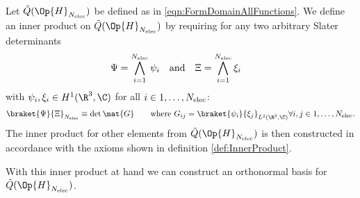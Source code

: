 \begin{defn}
	Let $\tilde{Q}(\Op{H}_{\Nelec})$ be defined as in \eqref{eqn:FormDomainAllFunctions}.
	We define an inner product on $\tilde{Q}(\Op{H}_{\Nelec})$ by
	requiring for any two arbitrary Slater determinants
	\begin{align*}
		\Psi &= \bigwedge_{i=1}^{N_\text{elec}} \psi_i
		&&\text{and}& \Xi &= \bigwedge_{i=1}^{N_\text{elec}} \xi_i
	\end{align*}
	with $\psi_i, \xi_i \in H^1(\R^3, \C)$ for all $i \in 1,\ldots,N_\text{elec}$:
	\begin{align}
		\braket{\Psi}{\Xi}_{\Nelec} \equiv \det \mat{G}
		\qquad
		\text{where } G_{ij} = \braket{\psi_i}{\xi_j}_{L^2(\R^3, \C)} \forall i,j \in 1,\ldots,\Nelec.
		\label{eqn:InnerProductFormDomain}
	\end{align}
	The inner product for other elements from $\tilde{Q}(\Op{H}_{\Nelec})$
	is then constructed in accordance
	with the axioms shown in definition \vref{def:InnerProduct}.
\end{defn}

\noindent
With this inner product at hand we can construct an orthonormal basis for
$\tilde{Q}(\Op{H}_{\Nelec})$.

